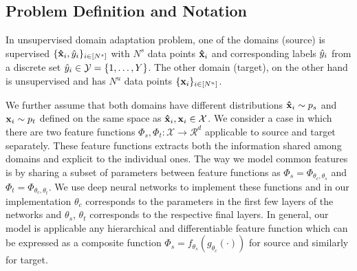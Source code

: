 
\subsection{Problem Definition and Notation}
\label{prob:def}
In unsupervised domain adaptation problem, one of the domains (source) is supervised $\{\mathbf{\hat{x}}_i, \hat{y}_i \}_{i \in [N^s]}$ with $N^s$ data points $\mathbf{\hat{x}}_i$ and corresponding labels $\hat{y}_i$ from a discrete set $\hat{y}_i \in \mathcal{Y} = \{1,\ldots, Y \}$.  The other domain (target), on the other hand is unsupervised and has $N^u$ data points $\{\mathbf{x}_i \}_{i \in [N^u]}$. 

We further assume that both domains have different distributions $\mathbf{\hat{x}}_i \sim p_s$ and $\mathbf{x}_i \sim p_t$ defined on the same space as $\mathbf{\hat{x}}_i,\mathbf{x}_i \in \mathcal{X}$. We consider a case in which there are two feature functions  \mbox{$\Phi_s, \Phi_t:\mathcal{X}\rightarrow \mathcal{R}^d$} applicable to source and target separately. These feature functions extracts both the information shared among domains and explicit to the individual ones. The way we model common features is by sharing a subset of parameters between feature functions as \mbox{$\Phi_s=\Phi_{\theta_c,\theta_s}$} and \mbox{$\Phi_t=\Phi_{\theta_c,\theta_t}$}. We use deep neural networks to implement these functions and in our implementation $\theta_c$ corresponds to the parameters in the first few layers of the networks and $\theta_s$, $\theta_t$ corresponds to the respective final layers. In general, our model is applicable any hierarchical and differentiable feature function which can be expressed as a composite function $\Phi_s = f_{\theta_s}(g_{\theta_c}(\cdot))$ for source and similarly for target.


